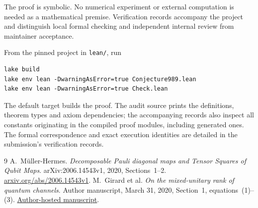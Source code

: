 \documentclass[11pt]{article}
\begin{document}
The proof is symbolic. No numerical experiment or external computation is
needed as a mathematical premise. Verification records accompany the project
and distinguish local formal checking and independent internal review from
maintainer acceptance.

From the pinned project in \texttt{lean/}, run
\begin{verbatim}
lake build
lake env lean -DwarningAsError=true Conjecture989.lean
lake env lean -DwarningAsError=true Check.lean
\end{verbatim}
The default target builds the proof. The audit source prints the definitions,
theorem types and axiom dependencies; the accompanying records also inspect
all constants originating in the compiled proof modules, including generated
ones. The formal correspondence and exact execution identities are detailed
in the submission's verification records.

\begin{thebibliography}{9}
A.~M\"uller-Hermes.
\emph{Decomposable Pauli diagonal maps and Tensor Squares of Qubit Maps}.
arXiv:2006.14543v1, 2020, Sections~1--2.
\href{https://arxiv.org/abs/2006.14543v1}{arxiv.org/abs/2006.14543v1}.
M.~Girard et al.
\emph{On the mixed-unitary rank of quantum channels}.
Author manuscript, March 31, 2020, Section~1, equations~(1)--(3).
\href{https://cs.uwaterloo.ca/~watrous/Papers/MixedUnitaryRank.pdf}{Author-hosted manuscript}.
\end{thebibliography}
\end{document}
